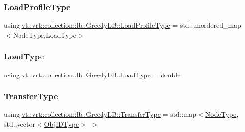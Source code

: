 \mbox{\label{structvt_1_1vrt_1_1collection_1_1lb_1_1_greedy_l_b_a3db2c9b36ac99ed4aed38519be4aad60}} 
\subsubsection{\texorpdfstring{Load\+Profile\+Type}{LoadProfileType}}
{\footnotesize\ttfamily using \hyperlink{structvt_1_1vrt_1_1collection_1_1lb_1_1_greedy_l_b_a3db2c9b36ac99ed4aed38519be4aad60}{vt\+::vrt\+::collection\+::lb\+::\+Greedy\+L\+B\+::\+Load\+Profile\+Type} =  std\+::unordered\+\_\+map$<$\hyperlink{namespacevt_a866da9d0efc19c0a1ce79e9e492f47e2}{Node\+Type},\hyperlink{structvt_1_1vrt_1_1collection_1_1lb_1_1_base_l_b_a215e22b9f12678303f49615ae3be05cc}{Load\+Type}$>$}

\mbox{\label{structvt_1_1vrt_1_1collection_1_1lb_1_1_greedy_l_b_a7127421bb4c8c56482d07cb6e35ccc11}} 
\subsubsection{\texorpdfstring{Load\+Type}{LoadType}}
{\footnotesize\ttfamily using \hyperlink{structvt_1_1vrt_1_1collection_1_1lb_1_1_greedy_l_b_a7127421bb4c8c56482d07cb6e35ccc11}{vt\+::vrt\+::collection\+::lb\+::\+Greedy\+L\+B\+::\+Load\+Type} =  double}

\mbox{\label{structvt_1_1vrt_1_1collection_1_1lb_1_1_greedy_l_b_af15e80ab3cfa9337647801dfa08fbf53}} 
\subsubsection{\texorpdfstring{Transfer\+Type}{TransferType}}
{\footnotesize\ttfamily using \hyperlink{structvt_1_1vrt_1_1collection_1_1lb_1_1_greedy_l_b_af15e80ab3cfa9337647801dfa08fbf53}{vt\+::vrt\+::collection\+::lb\+::\+Greedy\+L\+B\+::\+Transfer\+Type} =  std\+::map$<$\hyperlink{namespacevt_a866da9d0efc19c0a1ce79e9e492f47e2}{Node\+Type}, std\+::vector$<$\hyperlink{structvt_1_1vrt_1_1collection_1_1lb_1_1_base_l_b_a15a2f756b59c8c2437985206b32aa403}{Obj\+I\+D\+Type}$>$ $>$}



